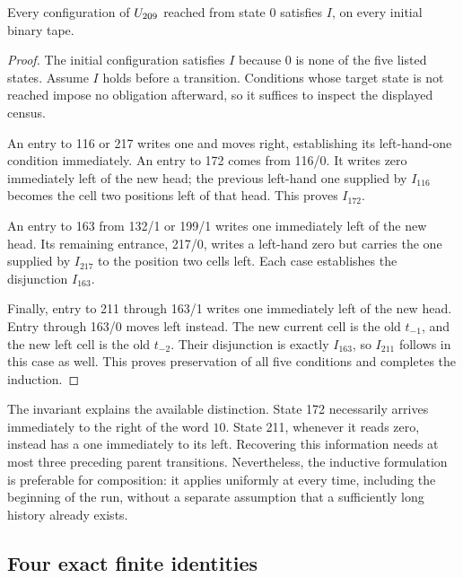 \begin{lemma}
\label{lem:local208-invariant}
Every configuration of $U_{209}$ reached from state 0 satisfies $I$, on
every initial binary tape.
\end{lemma}
\begin{proof}
The initial configuration satisfies $I$ because 0 is none of the five
listed states. Assume $I$ holds before a transition. Conditions whose
target state is not reached impose no obligation afterward, so it suffices
to inspect the displayed census.

An entry to 116 or 217 writes one and moves right, establishing its
left-hand-one condition immediately. An entry to 172 comes from 116/0.
It writes zero immediately left of the new head; the previous left-hand
one supplied by $I_{116}$ becomes the cell two positions left of that head.
This proves $I_{172}$.

An entry to 163 from 132/1 or 199/1 writes one immediately left of the new
head. Its remaining entrance, 217/0, writes a left-hand zero but carries
the one supplied by $I_{217}$ to the position two cells left. Each case
establishes the disjunction $I_{163}$.

Finally, entry to 211 through 163/1 writes one immediately left of the
new head. Entry through 163/0 moves left instead. The new current cell is
the old $t_{-1}$, and the new left cell is the old $t_{-2}$. Their disjunction
is exactly $I_{163}$, so $I_{211}$ follows in this case as well. This proves
preservation of all five conditions and completes the induction.
\end{proof}

The invariant explains the available distinction. State 172 necessarily
arrives immediately to the right of the word $10$. State 211, whenever it
reads zero, instead has a one immediately to its left. Recovering this
information needs at most three preceding parent transitions. Nevertheless,
the inductive formulation is preferable for composition: it applies uniformly
at every time, including the beginning of the run, without a separate
assumption that a sufficiently long history already exists.

\subsection{Four exact finite identities}
\label{subsec:local208-blocks}

